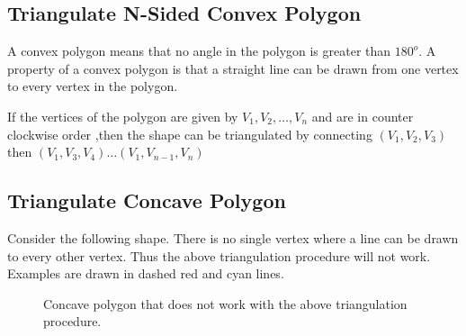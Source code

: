 \documentclass[a4paper,10pt]{scrartcl}
\begin{document}
\subsection{Triangulate N-Sided Convex Polygon}

A convex polygon means that no angle in the polygon is greater than $180 ^o$. A property of a convex polygon is that
a straight line can be drawn from one vertex to every vertex in the polygon.

If the vertices of the polygon are given by $V_1, V_2, \dots, V_n$ and are in counter clockwise order
,then the shape can be triangulated by connecting $(V_1, V_2, V_3)$ then $(V_1, V_3, V_4) \dots (V_1, V_{n-1}, V_{n})$

\subsection{Triangulate Concave Polygon}

Consider the following shape. There is no single vertex where a line can be drawn to every other vertex.
Thus the above triangulation procedure will not work. Examples are drawn in dashed red and cyan lines.

\begin{figure}[!h]
 \centering

 \caption{Concave polygon that does not work with the above triangulation procedure.}
 
\end{figure}
\end{document}
